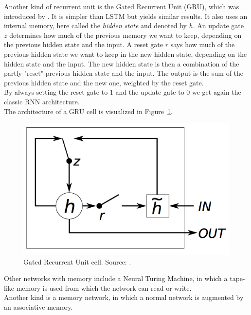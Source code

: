 Another kind of recurrent unit is the Gated Recurrent Unit (GRU), which was introduced by \cite{Cho2014LearningTranslation}. It is simpler than LSTM but yields similar results.
It also uses an internal memory, here called the \textit{hidden state} and denoted by $h$. An update gate $z$ determines how much of the previous memory we want to keep, depending on the previous hidden state and the input. A reset gate $r$ says how much of the previous hidden state we want to keep in the new hidden state, depending on the hidden state and the input. The new hidden state is then a combination of the partly "reset" previous hidden state and the input. The output is the sum of the previous hidden state and the new one, weighted by the reset gate.\\
By always setting the reset gate to $1$ and the update gate to $0$ we get again the classic RNN architecture.\\
The architecture of a GRU cell is visualized in Figure~\ref{fig:gru}.\\
\begin{figure}[htb]
    \centering
    \includegraphics[width=0.6\linewidth]{images/gru.png}
    \caption[Gated Recurrent Unit cell]{Gated Recurrent Unit cell. Source: \cite{journals/corr/ChungGCB14}.}
    \label{fig:gru}
\end{figure}

Other networks with memory include a Neural Turing Machine, in which a tape-like memory is used from which the network can read or write.\\
Another kind is a memory network, in which a normal network is augmented by an associative memory.\\
